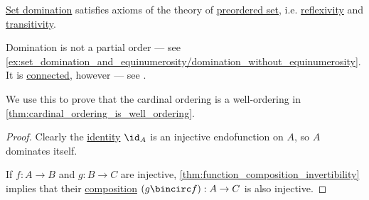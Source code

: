 \begin{proposition}\label{thm:set_domination_is_preorder}
  \hyperref[def:set_domination]{Set domination} satisfies axioms of the theory of \hyperref[def:preordered_set]{preordered set}, i.e. \hyperref[def:binary_relation/reflexive]{reflexivity} and \hyperref[def:binary_relation/transitive]{transitivity}.
\end{proposition}
\begin{comments}
  \item Domination is not a partial order --- see \cref{ex:set_domination_and_equinumerosity/domination_without_equinumerosity}. It is \hyperref[def:binary_relation/connected]{connected}, however --- see .
\end{comments}
\begin{comments}
  \item We use this to prove that the cardinal ordering is a well-ordering in \cref{thm:cardinal_ordering_is_well_ordering}.
\end{comments}
\begin{proof}
   Clearly the \hyperref[def:set_valued_function/identity]{identity} \( \id_A \) is an injective endofunction on \( A \), so \( A \) dominates itself.

   If \( f: A \to B \) and \( g: B \to C \) are injective, \cref{thm:function_composition_invertibility} implies that their \hyperref[def:set_valued_function/composition]{composition} \( (g \bincirc f): A \to C \) is also injective.
\end{proof}

